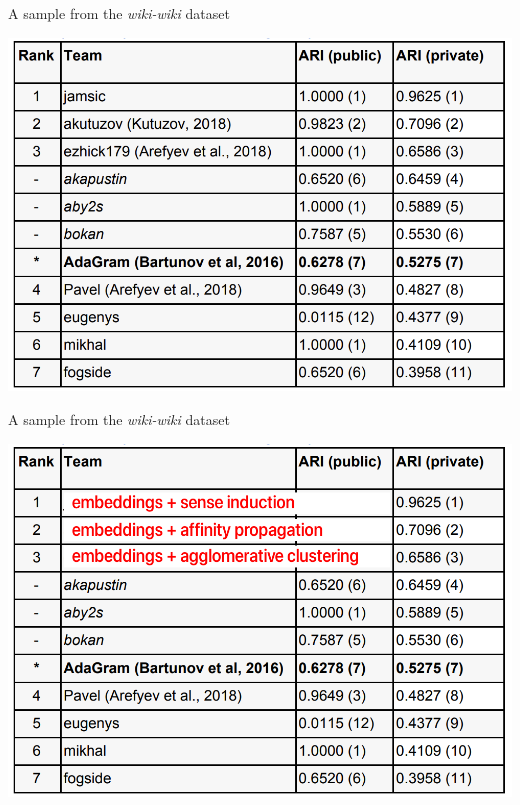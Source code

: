\begin{frame}{A sample from the \textit{wiki-wiki} dataset }

{\centering
\includegraphics[width=.8\textwidth]{figures/wiki-wiki}
}	
\end{frame}



\begin{frame}{A sample from the \textit{wiki-wiki} dataset }

{\centering
\includegraphics[width=.8\textwidth]{figures/wiki-wiki-top}
}	
\end{frame}


